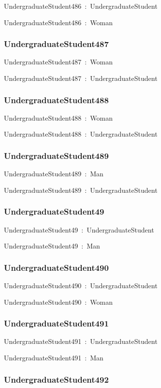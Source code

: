 \documentclass{article}
\begin{document}
UndergraduateStudent486~:~UndergraduateStudent

UndergraduateStudent486~:~Woman

\subsubsection*{UndergraduateStudent487}

UndergraduateStudent487~:~Woman

UndergraduateStudent487~:~UndergraduateStudent

\subsubsection*{UndergraduateStudent488}

UndergraduateStudent488~:~Woman

UndergraduateStudent488~:~UndergraduateStudent

\subsubsection*{UndergraduateStudent489}

UndergraduateStudent489~:~Man

UndergraduateStudent489~:~UndergraduateStudent

\subsubsection*{UndergraduateStudent49}

UndergraduateStudent49~:~UndergraduateStudent

UndergraduateStudent49~:~Man

\subsubsection*{UndergraduateStudent490}

UndergraduateStudent490~:~UndergraduateStudent

UndergraduateStudent490~:~Woman

\subsubsection*{UndergraduateStudent491}

UndergraduateStudent491~:~UndergraduateStudent

UndergraduateStudent491~:~Man

\subsubsection*{UndergraduateStudent492}
\end{document}
